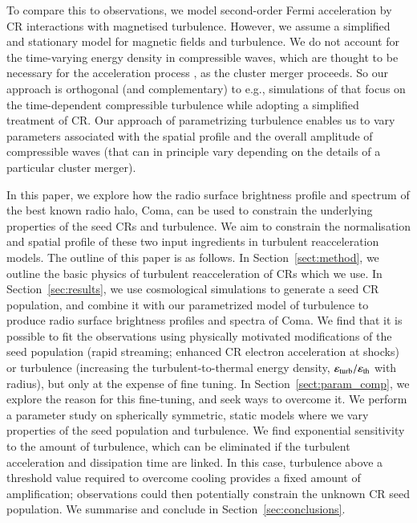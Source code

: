\documentclass[fleqn,usenatbib,useAMS]{mnras}
\newcommand{\eps}{\varepsilon}
\begin{document}
To compare this to observations, we model second-order Fermi acceleration by CR
interactions with magnetised turbulence. However, we assume a simplified and
stationary model for magnetic fields and turbulence. We do not account for the
time-varying energy density in compressible waves, which are thought to be
necessary for the acceleration process \citep{brunetti07,brunetti11}, as the
cluster merger proceeds.  So our approach is orthogonal (and complementary) to
e.g., simulations of \citealp{miniati15} that focus on the time-dependent
compressible turbulence while adopting a simplified treatment of CR. Our
approach of parametrizing turbulence enables us to vary parameters associated
with the spatial profile and the overall amplitude of compressible waves (that
can in principle vary depending on the details of a particular cluster merger).

In this paper, we explore how the radio surface brightness profile and spectrum
of the best known radio halo, Coma, can be used to constrain the underlying
properties of the seed CRs and turbulence. We aim to constrain the normalisation
and spatial profile of these two input ingredients in turbulent reacceleration
models. The outline of this paper is as follows. In Section~\ref{sect:method}, we
outline the basic physics of turbulent reacceleration of CRs which we use. In
Section~\ref{sec:results}, we use cosmological simulations to generate a seed CR
population, and combine it with our parametrized model of turbulence to produce
radio surface brightness profiles and spectra of Coma. We find that it is
possible to fit the observations using physically motivated modifications of the
seed population (rapid streaming; enhanced CR electron acceleration at shocks)
or turbulence (increasing the turbulent-to-thermal energy density, $\eps_{\rm
  turb}/\eps_{\rm th}$ with radius), but only at the expense of fine
tuning. In Section~\ref{sect:param_comp}, we explore the reason for this fine-tuning,
and seek ways to overcome it. We perform a parameter study on spherically
symmetric, static models where we vary properties of the seed population and
turbulence. We find exponential sensitivity to the amount of turbulence, which
can be eliminated if the turbulent acceleration and dissipation time are
linked. In this case, turbulence above a threshold value required to overcome
cooling provides a fixed amount of amplification; observations could then
potentially constrain the unknown CR seed population. We summarise and conclude
in Section~\ref{sec:conclusions}.
\end{document}
